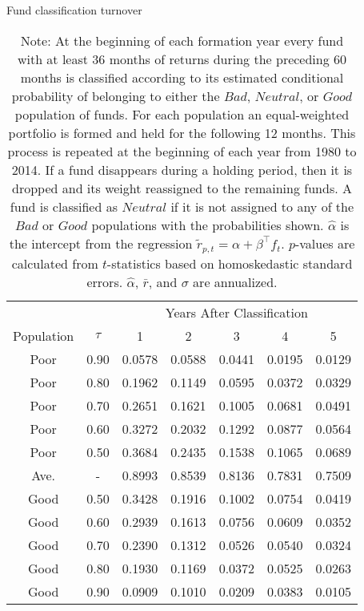 \begin{table}[t]
\centering
\small
\captionsetup{labelsep=colon, font=footnotesize, justification=centerfirst}
\caption{Fund classification turnover}
    \begin{tabular}{*{7}{c}}
    \toprule
    & & \multicolumn{5}{c}{Years After Classification} \\
    \cmidrule{3-7}
    Population & $\tau$ & 1 & 2 & 3 & 4 & 5 \\
    \midrule
    Poor & 0.90 & 0.0578 & 0.0588 & 0.0441 & 0.0195 & 0.0129 \\
    Poor & 0.80 & 0.1962 & 0.1149 & 0.0595 & 0.0372 & 0.0329 \\
    Poor & 0.70 & 0.2651 & 0.1621 & 0.1005 & 0.0681 & 0.0491 \\
    Poor & 0.60 & 0.3272 & 0.2032 & 0.1292 & 0.0877 & 0.0564 \\
    Poor & 0.50 & 0.3684 & 0.2435 & 0.1538 & 0.1065 & 0.0689 \\
    Ave. & - & 0.8993 & 0.8539 & 0.8136 & 0.7831 & 0.7509 \\
    Good & 0.50 & 0.3428 & 0.1916 & 0.1002 & 0.0754 & 0.0419 \\
    Good & 0.60 & 0.2939 & 0.1613 & 0.0756 & 0.0609 & 0.0352 \\
    Good & 0.70 & 0.2390 & 0.1312 & 0.0526 & 0.0540 & 0.0324 \\
    Good & 0.80 & 0.1930 & 0.1169 & 0.0372 & 0.0525 & 0.0263 \\
    Good & 0.90 & 0.0909 & 0.1010 & 0.0209 & 0.0383 & 0.0105 \\
    \bottomrule
    \end{tabular}
\captionsetup{position=below, font=footnotesize, justification=justified, width=0.58\linewidth}
\caption*{Note: At the beginning of each formation year every fund with at least 36 months of returns during the preceding 60 months is classified according to its estimated conditional probability of belonging to either the $Bad$, $Neutral$, or $Good$ population of funds.  For each population an equal-weighted portfolio is formed and held for the following 12 months.  This process is repeated at the beginning of each year from 1980 to 2014.  If a fund disappears during a holding period, then it is dropped and its weight reassigned to the remaining funds.  A fund is classified as $Neutral$ if it is not assigned to any of the $Bad$ or $Good$ populations with the probabilities shown.  $\hat{\alpha}$ is the intercept from the regression $\tilde{r}_{p,t} = \alpha + \beta^\top f_{t}$.  $p$-values are calculated from $t$-statistics based on homoskedastic standard errors. $\hat{\alpha}$, $\bar{r}$, and $\sigma$ are annualized.}
\label{tab:turnover}
\end{table}

